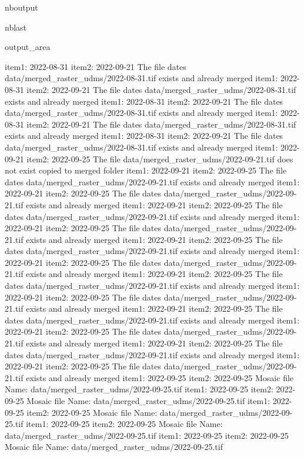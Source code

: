 \documentclass[letterpaper,10pt]{sphinxmanual}
\begin{document}
\begin{sphinxuseclass}{nboutput}
\begin{sphinxuseclass}{nblast}
{\begin{sphinxuseclass}{output_area}
\begin{sphinxuseclass}{}
\begin{sphinxVerbatim}[commandchars=\\\{\}]
item1:  2022-08-31
item2:  2022-09-21
The file dates data/merged\_raster\_udms/2022-08-31.tif exists and already merged
item1:  2022-08-31
item2:  2022-09-21
The file dates data/merged\_raster\_udms/2022-08-31.tif exists and already merged
item1:  2022-08-31
item2:  2022-09-21
The file dates data/merged\_raster\_udms/2022-08-31.tif exists and already merged
item1:  2022-08-31
item2:  2022-09-21
The file dates data/merged\_raster\_udms/2022-08-31.tif exists and already merged
item1:  2022-08-31
item2:  2022-09-21
The file dates data/merged\_raster\_udms/2022-08-31.tif exists and already merged
item1:  2022-09-21
item2:  2022-09-25
The file data/merged\_raster\_udms/2022-09-21.tif does not exist copied to merged folder
item1:  2022-09-21
item2:  2022-09-25
The file dates data/merged\_raster\_udms/2022-09-21.tif exists and already merged
item1:  2022-09-21
item2:  2022-09-25
The file dates data/merged\_raster\_udms/2022-09-21.tif exists and already merged
item1:  2022-09-21
item2:  2022-09-25
The file dates data/merged\_raster\_udms/2022-09-21.tif exists and already merged
item1:  2022-09-21
item2:  2022-09-25
The file dates data/merged\_raster\_udms/2022-09-21.tif exists and already merged
item1:  2022-09-21
item2:  2022-09-25
The file dates data/merged\_raster\_udms/2022-09-21.tif exists and already merged
item1:  2022-09-21
item2:  2022-09-25
The file dates data/merged\_raster\_udms/2022-09-21.tif exists and already merged
item1:  2022-09-21
item2:  2022-09-25
The file dates data/merged\_raster\_udms/2022-09-21.tif exists and already merged
item1:  2022-09-21
item2:  2022-09-25
The file dates data/merged\_raster\_udms/2022-09-21.tif exists and already merged
item1:  2022-09-21
item2:  2022-09-25
The file dates data/merged\_raster\_udms/2022-09-21.tif exists and already merged
item1:  2022-09-21
item2:  2022-09-25
The file dates data/merged\_raster\_udms/2022-09-21.tif exists and already merged
item1:  2022-09-21
item2:  2022-09-25
The file dates data/merged\_raster\_udms/2022-09-21.tif exists and already merged
item1:  2022-09-21
item2:  2022-09-25
The file dates data/merged\_raster\_udms/2022-09-21.tif exists and already merged
item1:  2022-09-25
item2:  2022-09-25
Mosaic file Name:  data/merged\_raster\_udms/2022-09-25.tif
item1:  2022-09-25
item2:  2022-09-25
Mosaic file Name:  data/merged\_raster\_udms/2022-09-25.tif
item1:  2022-09-25
item2:  2022-09-25
Mosaic file Name:  data/merged\_raster\_udms/2022-09-25.tif
item1:  2022-09-25
item2:  2022-09-25
Mosaic file Name:  data/merged\_raster\_udms/2022-09-25.tif
item1:  2022-09-25
item2:  2022-09-25
Mosaic file Name:  data/merged\_raster\_udms/2022-09-25.tif

\end{sphinxVerbatim}
\end{sphinxuseclass}
\end{sphinxuseclass}}
\end{sphinxuseclass}
\end{sphinxuseclass}
\end{document}

